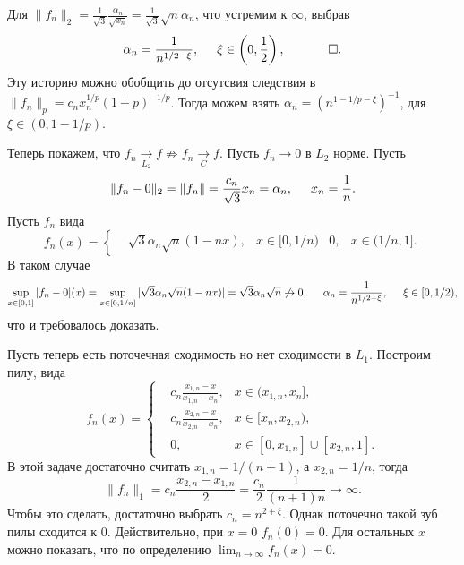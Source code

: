 Для $\|f_n\|_2 = \frac{1}{\sqrt{3}} \frac{\alpha_n}{\sqrt{x_n}} = \frac{1}{\sqrt{3}} \sqrt{n} \alpha_n$, что устремим к $\infty$, выбрав
\begin{equation*}
    \alpha_n = \frac{1}{n^{1/2-\xi}},
    \hspace{5 mm} 
    \xi \in\left(0, \frac{1}{2}\right),
    \hspace{5 mm} 
    \qed.
\end{equation*}
Эту историю можно обобщить до отсутсвия следствия в $\|f_n\|_p = c_n x_n^{1/p} (1+p)^{-1/p}$. Тогда можем взять $\alpha_n = \left(n^{1-1/p-\xi}\right)^{-1}$, для $\xi \in (0, 1-1/p)$.

Теперь покажем, что $f_n \underset{L_2}{\to}  f \not \Rightarrow f_n \underset{C}{\to} f$. Пусть $f_n \to 0$ в $L_2$ норме. Пусть
\begin{equation*}
    \|f_n - 0\|_2 = \|f_n\| = \frac{c_n}{\sqrt{3}} x_n = \alpha_n,
    \hspace{5 mm}  x_n = \frac{1}{n}.
\end{equation*}
Пусть $f_n$ вида
\begin{equation*}
    f_n(x) = \left\{\begin{aligned}
        &\sqrt{3} \alpha_n \sqrt{n} (1-nx), &x\in[0, 1/n)
        &0, &x\in(1/n, 1].
    \end{aligned}\right. 
\end{equation*}
В таком случае
\begin{equation*}
    \sup_{x\in[0, 1]} |f_n - 0|(x) = \sup_{x\in[0, 1/n]} |\sqrt{3} \alpha_n \sqrt{n} (1-nx)| =
    \sqrt{3}  \alpha_n \sqrt{n} \not \to 0,
    \hspace{5 mm}   
    \alpha_n = \frac{1}{n^{1/2-\xi}},
    \hspace{5 mm} \xi \in[0, 1/2),
\end{equation*}
что и требовалось доказать. 

Пусть теперь есть поточечная сходимость но нет сходимости в $L_1$. Построим пилу, вида
\begin{equation*}
    f_n (x) = \left\{\begin{aligned}
        &c_n \textstyle \frac{x_{1,n}-x}{x_{1,n}-x_n}, 
        &x \in (x_{1,n}, x_n], \\
        &c_n \textstyle \frac{x_{2,n}-x}{x_{2,n}-x_n}, 
        &x \in[x_n, x_{2,n}), \\
        &0, 
        & x\in[0, x_{1,n}] \cup [x_{2,n}, 1].
    \end{aligned}\right.
\end{equation*}
В этой задаче достаточно считать $x_{1,n} = 1/(n+1)$, а $x_{2,n} = 1/n$, тогда
\begin{equation*}
    \|f_n\|_1 = c_n \frac{x_{2,n}-x_{1,n}}{2} = \frac{c_n}{2} \frac{1}{(n+1)n} \to \infty.
\end{equation*}
Чтобы это сделать, достаточно выбрать $c_n = n^{2+\xi}$. Однак поточечно такой зуб пилы сходится к $0$. Действительно, при $x=0$  $f_n(0) = 0$. Для остальных $x$ можно показать, что по определению $\lim_{n\to \infty} f_n (x) = 0$. 